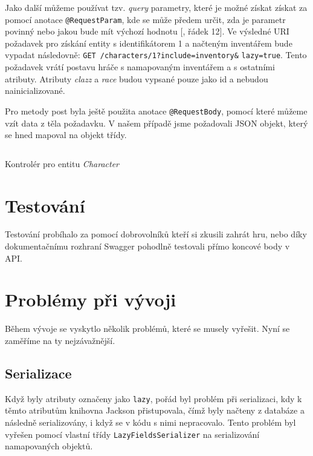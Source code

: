 Jako další můžeme používat tzv. \textit{query} parametry, které je možné získat získat za pomocí anotace \texttt{@RequestParam}, kde se může předem určit, zda je parametr povinný nebo jakou bude mít výchozí hodnotu [, řádek 12]. Ve výsledné URI požadavek pro získání entity s identifikátorem 1 a načteným inventářem bude vypadat následovně: \texttt{GET /characters/1?include=inventory\&} \texttt{lazy=true}. Tento požadavek vrátí postavu hráče s namapovaným inventářem a s ostatními atributy. Atributy \textit{clazz} a \textit{race} 
budou vypsané pouze jako id a nebudou nainicializované.

Pro metody post byla ještě použita anotace \texttt{@RequestBody}, pomocí které můžeme vzít data z těla požadavku. V našem případě jsme požadovali JSON objekt, který se hned mapoval na objekt třídy.

\begin{listing}[ht!]
    \inputminted[]{Java}{resources/code/impl/CharacterController.java}
    \caption{Kontrolér pro entitu \textit{Character}}
    \label{code:characterController}
\end{listing}


\section{Testování}\label{sec:testing}
Testování probíhalo za pomocí dobrovolníků kteří si zkusili zahrát hru, nebo díky dokumentačnímu rozhraní Swagger  pohodlně testovali přímo koncové body v API.



\section{Problémy při vývoji}\label{sec:impl:problems}
Během vývoje se vyskytlo několik problémů, které se musely vyřešit. Nyní se zaměříme na ty nejzávažnější.

\subsection{Serializace}
Když byly atributy označeny jako \texttt{lazy}, pořád byl problém při serializaci, kdy k těmto atributům knihovna Jackson přistupovala, čímž byly načteny z databáze a následně serializovány, i když se v kódu s nimi nepracovalo. Tento problém byl vyřešen pomocí vlastní třídy \texttt{LazyFieldsSerializer}
na serializování namapovaných objektů. 

